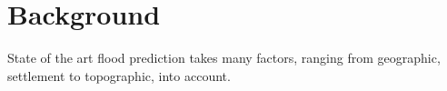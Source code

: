 \section{Background}

State of the art flood prediction takes many factors, ranging from geographic, settlement to topographic, into account.